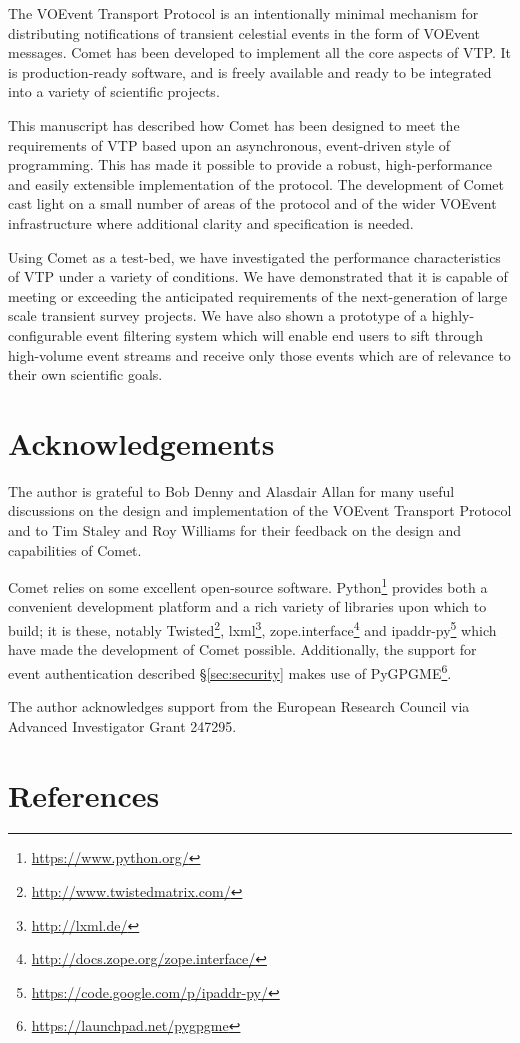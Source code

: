 \documentclass[5p,authoryear]{elsarticle}
\begin{document}
The VOEvent Transport Protocol is an intentionally minimal mechanism for
distributing notifications of transient celestial events in the form of
VOEvent messages. Comet has been developed to implement all the core aspects
of VTP. It is production-ready software, and is freely available and ready to
be integrated into a variety of scientific projects.

This manuscript has described how Comet has been designed to meet the
requirements of VTP based upon an asynchronous, event-driven style of
programming. This has made it possible to provide a robust, high-performance
and easily extensible implementation of the protocol. The development of Comet
cast light on a small number of areas of the protocol and of the wider VOEvent
infrastructure where additional clarity and specification is needed.

Using Comet as a test-bed, we have investigated the performance characteristics
of VTP under a variety of conditions. We have demonstrated that it is capable
of meeting or exceeding the anticipated requirements of the next-generation of
large scale transient survey projects. We have also shown a prototype of a
highly-configurable event filtering system which will enable end users to
sift through high-volume event streams and receive only those events which are
of relevance to their own scientific goals.

\section{Acknowledgements}
\label{sec:ack}

The author is grateful to Bob Denny and Alasdair Allan for many useful
discussions on the design and implementation of the VOEvent Transport Protocol
and to Tim Staley and Roy Williams for their feedback on the design and
capabilities of Comet.

Comet relies on some excellent open-source software.
Python\footnote{\url{https://www.python.org/}} provides both a convenient
development platform and a rich variety of libraries upon which to build; it
is these, notably Twisted\footnote{\url{http://www.twistedmatrix.com/}},
lxml\footnote{\url{http://lxml.de/}},
zope.interface\footnote{\url{http://docs.zope.org/zope.interface/}} and
ipaddr-py\footnote{\url{https://code.google.com/p/ipaddr-py/}} which have made
the development of Comet possible. Additionally, the support for event
authentication described \S\ref{sec:security} makes use of
PyGPGME\footnote{\url{https://launchpad.net/pygpgme}}.

The author acknowledges support from the European Research Council via
Advanced Investigator Grant 247295.

\section*{References}



\end{document}
